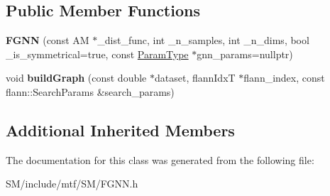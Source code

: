 \subsection*{Public Member Functions}
\begin{DoxyCompactItemize}
\item 
\hypertarget{classgnn_1_1FGNN_ae3498d3acfda9c5ddf5b1543a164260e}{{\bfseries F\-G\-N\-N} (const A\-M $\ast$\-\_\-dist\-\_\-func, int \-\_\-n\-\_\-samples, int \-\_\-n\-\_\-dims, bool \-\_\-is\-\_\-symmetrical=true, const \hyperlink{structgnn_1_1GNNParams}{Param\-Type} $\ast$gnn\-\_\-params=nullptr)}\label{classgnn_1_1FGNN_ae3498d3acfda9c5ddf5b1543a164260e}

\item 
\hypertarget{classgnn_1_1FGNN_a091ee7ef53961d0a946fa0fe94954cb9}{void {\bfseries build\-Graph} (const double $\ast$dataset, flann\-Idx\-T $\ast$flann\-\_\-index, const flann\-::\-Search\-Params \&search\-\_\-params)}\label{classgnn_1_1FGNN_a091ee7ef53961d0a946fa0fe94954cb9}

\end{DoxyCompactItemize}
\subsection*{Additional Inherited Members}


The documentation for this class was generated from the following file\-:\begin{DoxyCompactItemize}
\item 
S\-M/include/mtf/\-S\-M/F\-G\-N\-N.\-h\end{DoxyCompactItemize}
